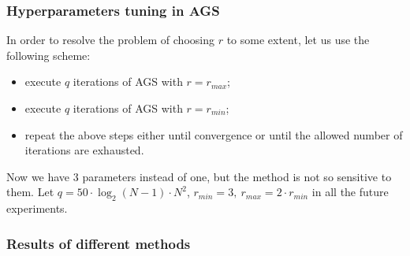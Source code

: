 \documentclass[aspectratio=1610]{beamer}
\begin{document}
\begin{frame}
  \frametitle{Hyperparameters tuning in AGS}
  In order to resolve the problem of choosing $r$ to some extent,
  let us use the following scheme:
  \begin{itemize}
    \item execute $q$ iterations of AGS with $r=r_{max}$;
    \item execute $q$ iterations of AGS with $r=r_{min}$;
    \item repeat the above steps either until convergence or until the allowed number of iterations are
  exhausted.
\end{itemize}
  Now we have 3 parameters instead of one, but the method is not so sensitive to them.
  Let $q=50\cdot\log_2(N-1)\cdot N^2$, $r_{min}=3,\:r_{max}=2\cdot r_{min}$ in all the future experiments.
\end{frame}


\begin{frame}
  \frametitle{Results of different methods}
  \begin{figure}[ht]
    \centering
  \end{figure}
\end{frame}
\end{document}
